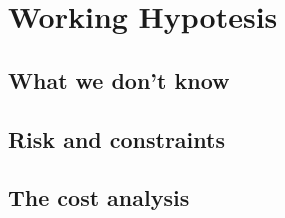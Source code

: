 \section{Working Hypotesis}


\subsection{What we don't know}

\subsection{Risk and constraints}

\subsection{The cost analysis}
